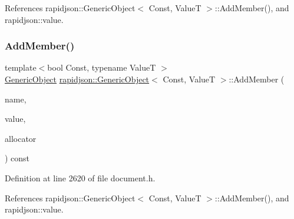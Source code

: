 References rapidjson\+::\+Generic\+Object$<$ Const, Value\+T $>$\+::\+Add\+Member(), and rapidjson\+::value.

\mbox{\label{classrapidjson_1_1_generic_object_ad0bc0d524c95b4e7eb816843ac40f264}} 
\subsubsection{\texorpdfstring{AddMember()}{AddMember()}\hspace{0.1cm}{\footnotesize\ttfamily [3/4]}}
{\footnotesize\ttfamily template$<$bool Const, typename ValueT $>$ \\
\mbox{\hyperlink{classrapidjson_1_1_generic_object}{Generic\+Object}} \mbox{\hyperlink{classrapidjson_1_1_generic_object}{rapidjson\+::\+Generic\+Object}}$<$ Const, ValueT $>$\+::Add\+Member (\begin{DoxyParamCaption}\item[{\mbox{\hyperlink{classrapidjson_1_1_generic_object_ab47bc8d841321d77c140e9df729f5233}{String\+Ref\+Type}}}]{name,  }\item[{\mbox{\hyperlink{classrapidjson_1_1_generic_object_a282660500748eff5ebab93b88a9d478f}{Value\+Type}} \&}]{value,  }\item[{\mbox{\hyperlink{classrapidjson_1_1_generic_object_ae30003e248368737382eed69ec8fe1eb}{Allocator\+Type}} \&}]{allocator }\end{DoxyParamCaption}) const}



Definition at line 2620 of file document.\+h.


\begin{DoxyCode}{0}

\end{DoxyCode}


References rapidjson\+::\+Generic\+Object$<$ Const, Value\+T $>$\+::\+Add\+Member(), and rapidjson\+::value.


